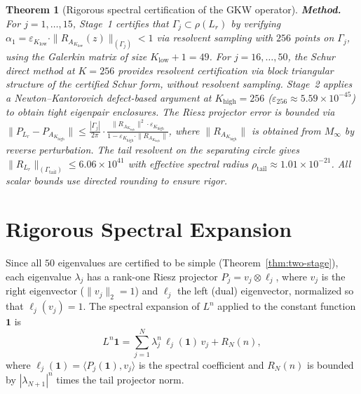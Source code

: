 \documentclass[11pt]{article}
\newtheorem{theorem}{Theorem}
\begin{document}
\begin{theorem}[Rigorous spectral certification of the GKW operator]
\medskip\noindent
\textbf{Method.}
For $j = 1, \ldots, 15$, Stage~1 certifies that $\Gamma_j \subset \rho(L_r)$ by verifying
$\alpha_1 = \varepsilon_{K_{\mathrm{low}}} \cdot \|R_{A_{K_{\mathrm{low}}}}(z)\|_{(\Gamma_j)} < 1$
via resolvent sampling with $256$ points on $\Gamma_j$, using the Galerkin matrix of size
$K_{\mathrm{low}} + 1 = 49$.
For $j = 16, \ldots, 50$, the Schur direct method at $K = 256$ provides resolvent certification
via block triangular structure of the certified Schur form, without resolvent sampling.
Stage~2 applies a Newton--Kantorovich defect-based argument at $K_{\mathrm{high}} = 256$
($\varepsilon_{256} \approx 5.59 \times 10^{-45}$) to obtain tight eigenpair enclosures.
The Riesz projector error is bounded via
$\|P_{L_r} - P_{A_{K_{\mathrm{high}}}}\| \leq \frac{|\Gamma_j|}{2\pi} \cdot
\frac{\|R_{A_{K_{\mathrm{high}}}}\|^2 \cdot \varepsilon_{K_{\mathrm{high}}}}{1 - \varepsilon_{K_{\mathrm{high}}} \cdot \|R_{A_{K_{\mathrm{high}}}}\|}$,
where $\|R_{A_{K_{\mathrm{high}}}}\|$ is obtained from $M_\infty$ by reverse perturbation.
The tail resolvent on the separating circle gives
$\|R_{L_r}\|_{(\Gamma_{\mathrm{tail}})} \leq 6.06 \times 10^{41}$
with effective spectral radius $\rho_{\mathrm{tail}} \approx 1.01 \times 10^{-21}$.
All scalar bounds use directed rounding to ensure rigor.
\end{theorem}

\clearpage
\section*{Rigorous Spectral Expansion}

Since all $50$ eigenvalues are certified to be simple (Theorem~\ref{thm:two-stage}),
each eigenvalue $\lambda_j$ has a rank-one Riesz projector
$P_j = v_j \otimes \ell_j$,
where $v_j$ is the right eigenvector ($\|v_j\|_2 = 1$) and $\ell_j$ the left (dual) eigenvector,
normalized so that $\ell_j(v_j) = 1$.
The spectral expansion of $L^n$ applied to the constant function $\mathbf{1}$ is
\begin{equation}
\label{eq:spectral-expansion}
L^n \mathbf{1} = \sum_{j=1}^{N} \lambda_j^n \, \ell_j(\mathbf{1}) \, v_j + R_N(n),
\end{equation}
where $\ell_j(\mathbf{1}) = \langle P_j(\mathbf{1}), v_j \rangle$ is the spectral coefficient
and $R_N(n)$ is bounded by $|\lambda_{N+1}|^n$ times the tail projector norm.
\end{document}
